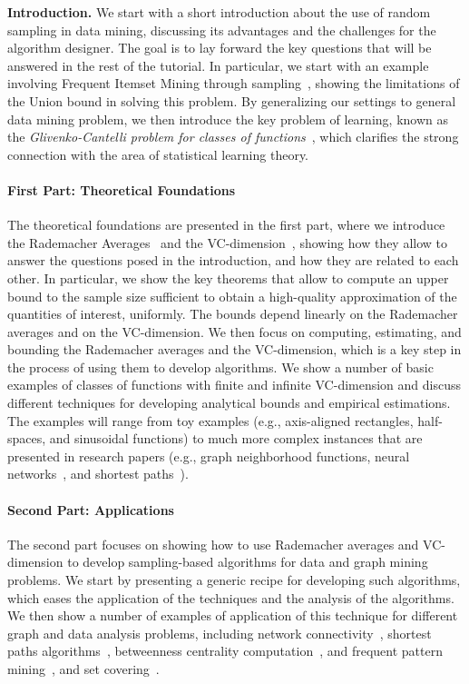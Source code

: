 \documentclass{sig-alternate-2013}
\begin{document}
{\bf Introduction.} We start with a short introduction about the use of random
sampling in data mining, discussing its advantages and the challenges for the
algorithm designer.  The goal is to lay forward the key questions that will be
answered in the rest of the tutorial. In particular, we start with an example
involving Frequent Itemset Mining through
sampling~\citep{RiondatoU14,RiondatoU15}, showing the limitations of the Union
bound in solving this problem. By generalizing our settings to general data
mining problem, we then introduce the key problem of learning, known as the
\emph{Glivenko-Cantelli problem for classes of functions}~\citep{Vapnik99},
which clarifies the strong connection with the area of statistical learning
theory.

\paragraph*{First Part: Theoretical Foundations}
The theoretical foundations are presented in the first part, where we introduce
the Rademacher Averages~\citep{BoucheronBL05,Koltchinskii01}  and the
VC-dimension~\citep{VapnikC71}, showing how they allow to answer the questions
posed in the introduction, and how they are related to each other. In
particular, we show the key theorems that allow to compute an upper bound to the
sample size sufficient to obtain a high-quality approximation of the quantities
of interest, uniformly. The bounds depend linearly on the Rademacher averages
and on the VC-dimension. We then focus on computing, estimating, and bounding
the Rademacher averages and the VC-dimension, which is a key
step in the process of using them to develop algorithms. We show a number of
basic examples of classes of functions with finite and infinite VC-dimension and
discuss different techniques for developing analytical bounds and empirical
estimations. The examples will range from toy examples (e.g., axis-aligned
rectangles, half-spaces, and sinusoidal functions) to much more complex
instances that are presented in research papers (e.g., graph neighborhood
functions, neural networks~\citep{AnthonyB99}, and shortest
paths~\citep{AbrahamDFGW11}).

\paragraph*{Second Part: Applications}
The second part focuses on showing how to use Rademacher averages and
VC-dimension to develop sampling-based algorithms for data and graph mining
problems. We start by presenting a generic recipe for developing such
algorithms, which eases the application of the techniques and the analysis of
the algorithms. We then show a number of examples of application of this
technique for different graph and data analysis problems, including network
connectivity~\citep{KleinbergSS08}, shortest paths
algorithms~\citep{AbrahamDFGW11}, betweenness centrality
computation~\citep{RiondatoK14}, and frequent pattern
mining~\citep{RiondatoU14,RiondatoV14,RiondatoU15}, and set
covering~\citep{BronnimannG95}.
\end{document}
